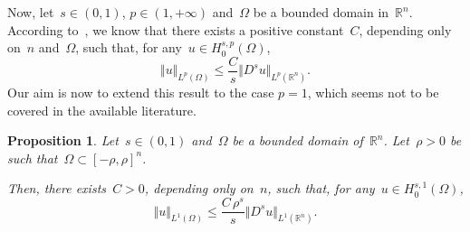 \documentclass[11pt,hyp,]{nyjm}
\numberwithin{equation}{section}
\newcommand{\R}{\mathbb{R}}
\newtheorem{proposition}[theorem]{Proposition}
\theoremstyle{remark}
\renewcommand{\leq}{\leqslant}
\begin{document}
		Now, let~$s \in (0,1)$, $p \in (1, +\infty)$ and~$\Omega$ be a bounded domain in~$\R^n$. According to~\cite[Theorem~2.9]{mora}, we know that there exists a positive
		constant~$C$, depending only on~$n$ and~$ \Omega$, such that, for any~$u \in H_0^{s,p}(\Omega)$,
		\begin{equation}\label{simn}
			\Vert u \Vert_{L^p(\Omega)} \leq \frac{C}{s} \Vert D^s u \Vert_{L^p(\R^n)}.
		\end{equation}
	Our aim is now to extend this result to the case $p=1$, which seems not to be covered in the available literature.		
		\begin{proposition}\label{costa}
			Let~$s \in (0,1)$ and~$\Omega$ be a bounded domain of~$\R^n$. Let~$\rho>0$ be such that~${\Omega \subset [-\rho,\rho]^n}$.
			
			Then, there exists~$C>0$, depending only on~$n$, such that, for any~$u \in H_0^{s,1}(\Omega)$,
			\begin{equation*}
				\Vert u \Vert_{L^1(\Omega)} \leq \frac{C\,\rho^s }{s} \Vert D^s u \Vert_{L^1(\R^n)}.
			\end{equation*}
		\end{proposition}
\end{document}
